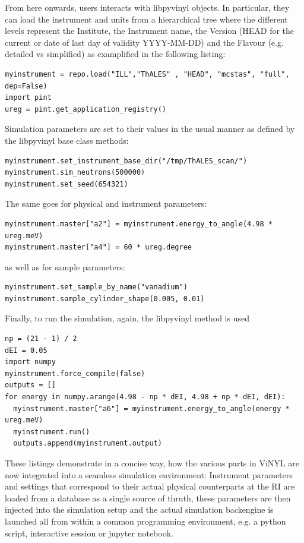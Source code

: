 \documentclass[11pt, a4paper]{article}
\begin{document}
From here onwards, users interacts with libpyvinyl objects. In particular, they
can load the instrument and units from a hierarchical tree where the different
levels represent the Institute, the Instrument name, the Version (HEAD for the
current or date of last day of validity YYYY-MM-DD) and the Flavour (e.g.
detailed vs simplified) as examplified in the following listing:
  \begin{lstlisting}
myinstrument = repo.load("ILL","ThALES" , "HEAD", "mcstas", "full", dep=False)
import pint
ureg = pint.get_application_registry()
\end{lstlisting}

Simulation parameters are set to their values in the usual manner as defined by the
libpyvinyl base class methods:
\begin{lstlisting}
myinstrument.set_instrument_base_dir("/tmp/ThALES_scan/")
myinstrument.sim_neutrons(500000)
myinstrument.set_seed(654321)
\end{lstlisting}

The same goes for physical and instrument parameters:
\begin{lstlisting}
myinstrument.master["a2"] = myinstrument.energy_to_angle(4.98 * ureg.meV)
myinstrument.master["a4"] = 60 * ureg.degree
\end{lstlisting}
as well as for sample parameters:
    \begin{lstlisting}
myinstrument.set_sample_by_name("vanadium")
myinstrument.sample_cylinder_shape(0.005, 0.01)
\end{lstlisting}
Finally, to run the simulation, again, the libpyvinyl method is used
\begin{lstlisting}
np = (21 - 1) / 2
dEI = 0.05
import numpy
myinstrument.force_compile(false)
outputs = []
for energy in numpy.arange(4.98 - np * dEI, 4.98 + np * dEI, dEI):
  myinstrument.master["a6"] = myinstrument.energy_to_angle(energy * ureg.meV)
  myinstrument.run()
  outputs.append(myinstrument.output)
\end{lstlisting}


These listings demonstrate in a concise way, how the various parts in ViNYL are
now integrated into a seamless simulation environment: Instrument parameters and settings
that correspond to their actual physical counterparts at the RI are loaded from
a database as a single source of thruth, these parameters are then injected into
the simulation setup and the actual simulation backengine is launched all from
within a common programming environment, e.g. a python script, interactive
session or jupyter notebook.
\end{document}
